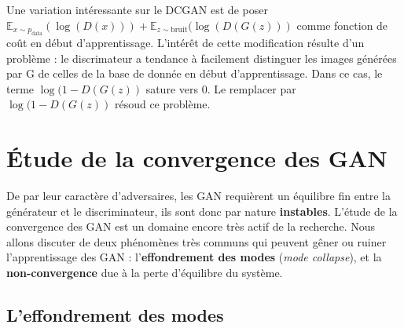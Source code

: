 Une variation intéressante sur le DCGAN est de poser $  \mathbb{E}_{x \sim p_{\mathrm{data}}}(\log (D(x))) + \mathbb{E}_{z \sim \mathrm{bruit}}(\log (D(G(z)))$ comme fonction de coût en début d'apprentissage. L'intérêt de cette modification résulte d'un problème : le discrimateur a tendance à facilement distinguer les images générées par G de celles de la base de donnée en début d'apprentissage. Dans ce cas, le terme $\log (1 - D(G(z))$ sature vers 0. Le remplacer par $\log (1 - D(G(z))$ résoud ce problème.


\section{Étude de la convergence des GAN}

De par leur caractère d'adversaires, les GAN requièrent un équilibre fin entre la générateur et le discriminateur, ils sont donc par nature \textbf{instables}. L'étude de la convergence des GAN est un domaine encore très actif de la recherche. Nous allons discuter de deux phénomènes très communs qui peuvent gêner ou ruiner l'apprentissage des GAN : l'\textbf{effondrement des modes} (\textit{mode collapse}), et la \textbf{non-convergence} due à la perte d'équilibre du système.

\subsection{L'effondrement des modes}

